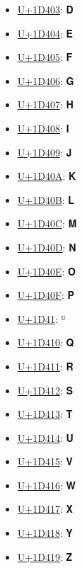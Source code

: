 \begin{itemize}
	\item \href{https://www.compart.com/en/unicode/U+1D403}{U+1D403}: 𝐃
	\item \href{https://www.compart.com/en/unicode/U+1D404}{U+1D404}: 𝐄
	\item \href{https://www.compart.com/en/unicode/U+1D405}{U+1D405}: 𝐅
	\item \href{https://www.compart.com/en/unicode/U+1D406}{U+1D406}: 𝐆
	\item \href{https://www.compart.com/en/unicode/U+1D407}{U+1D407}: 𝐇
	\item \href{https://www.compart.com/en/unicode/U+1D408}{U+1D408}: 𝐈
	\item \href{https://www.compart.com/en/unicode/U+1D409}{U+1D409}: 𝐉
	\item \href{https://www.compart.com/en/unicode/U+1D40A}{U+1D40A}: 𝐊
	\item \href{https://www.compart.com/en/unicode/U+1D40B}{U+1D40B}: 𝐋
	\item \href{https://www.compart.com/en/unicode/U+1D40C}{U+1D40C}: 𝐌
	\item \href{https://www.compart.com/en/unicode/U+1D40D}{U+1D40D}: 𝐍
	\item \href{https://www.compart.com/en/unicode/U+1D40E}{U+1D40E}: 𝐎
	\item \href{https://www.compart.com/en/unicode/U+1D40F}{U+1D40F}: 𝐏
	\item \href{https://www.compart.com/en/unicode/U+1D41}{U+1D41}: ᵁ
	\item \href{https://www.compart.com/en/unicode/U+1D410}{U+1D410}: 𝐐
	\item \href{https://www.compart.com/en/unicode/U+1D411}{U+1D411}: 𝐑
	\item \href{https://www.compart.com/en/unicode/U+1D412}{U+1D412}: 𝐒
	\item \href{https://www.compart.com/en/unicode/U+1D413}{U+1D413}: 𝐓
	\item \href{https://www.compart.com/en/unicode/U+1D414}{U+1D414}: 𝐔
	\item \href{https://www.compart.com/en/unicode/U+1D415}{U+1D415}: 𝐕
	\item \href{https://www.compart.com/en/unicode/U+1D416}{U+1D416}: 𝐖
	\item \href{https://www.compart.com/en/unicode/U+1D417}{U+1D417}: 𝐗
	\item \href{https://www.compart.com/en/unicode/U+1D418}{U+1D418}: 𝐘
	\item \href{https://www.compart.com/en/unicode/U+1D419}{U+1D419}: 𝐙

\end{itemize}
